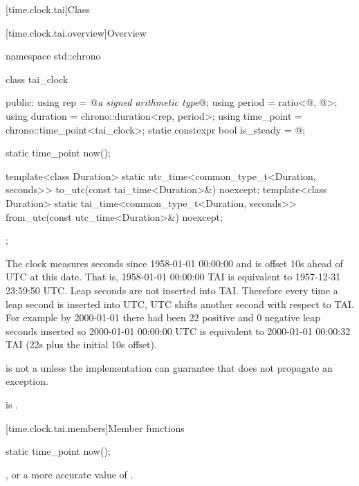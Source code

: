 [time.clock.tai]{Class }

[time.clock.tai.overview]{Overview}
%

\begin{codeblock}
namespace std::chrono {
  class tai_clock {
  public:
    using rep                       = @\textit{a signed arithmetic type}@;
    using period                    = ratio<@\unspecnc@, @\unspec@>;
    using duration                  = chrono::duration<rep, period>;
    using time_point                = chrono::time_point<tai_clock>;
    static constexpr bool is_steady = @\unspec@;

    static time_point now();

    template<class Duration>
      static utc_time<common_type_t<Duration, seconds>>
        to_utc(const tai_time<Duration>&) noexcept;
    template<class Duration>
      static tai_time<common_type_t<Duration, seconds>>
        from_utc(const utc_time<Duration>&) noexcept;
  };
}
\end{codeblock}

\pnum
The clock  measures seconds since 1958-01-01 00:00:00
and is offset 10s ahead of UTC at this date.
That is, 1958-01-01 00:00:00 TAI is equivalent to 1957-12-31 23:59:50 UTC\@.
Leap seconds are not inserted into TAI\@.
Therefore every time a leap second is inserted into UTC,
UTC shifts another second with respect to TAI\@.
For example by 2000-01-01 there had been
22 positive and 0 negative leap seconds inserted
so 2000-01-01 00:00:00 UTC is equivalent to 2000-01-01 00:00:32 TAI
(22s plus the initial 10s offset).

\pnum
{} is not a 
unless the implementation can guarantee that 
does not propagate an exception.
\begin{note}
 is .
\end{note}

[time.clock.tai.members]{Member functions}

%
\begin{itemdecl}
static time_point now();
\end{itemdecl}

\begin{itemdescr}
\pnum
\returns
{}, or a more accurate value of .
\end{itemdescr}

